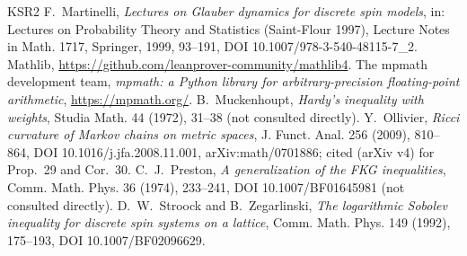 \documentclass[11pt,a4paper]{article}
\theoremstyle{definition}
\theoremstyle{remark}
\begin{document}
\begin{thebibliography}{KSR2}
 F.~Martinelli, \emph{Lectures on Glauber dynamics for discrete spin models}, in: Lectures on Probability Theory and Statistics (Saint-Flour 1997), Lecture Notes in Math. 1717, Springer, 1999, 93--191, DOI 10.1007/978-3-540-48115-7\_2.
 Mathlib, \url{https://github.com/leanprover-community/mathlib4}.
 The mpmath development team, \emph{mpmath: a Python library for arbitrary-precision floating-point arithmetic}, \url{https://mpmath.org/}.
 B.~Muckenhoupt, \emph{Hardy's inequality with weights}, Studia Math. 44 (1972), 31--38 (not consulted directly).
 Y.~Ollivier, \emph{Ricci curvature of Markov chains on metric spaces}, J. Funct. Anal. 256 (2009), 810--864, DOI 10.1016/j.jfa.2008.11.001, arXiv:math/0701886; cited (arXiv v4) for Prop.~29 and Cor.~30.
 C.~J.~Preston, \emph{A generalization of the FKG inequalities}, Comm. Math. Phys. 36 (1974), 233--241, DOI 10.1007/BF01645981 (not consulted directly).
 D.~W.~Stroock and B.~Zegarlinski, \emph{The logarithmic Sobolev inequality for discrete spin systems on a lattice}, Comm. Math. Phys. 149 (1992), 175--193, DOI 10.1007/BF02096629.
\end{thebibliography}
\end{document}
